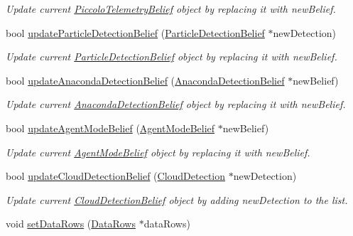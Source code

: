 \begin{DoxyCompactItemize}
\begin{DoxyCompactList}\small\item\em Update current \hyperlink{class_piccolo_telemetry_belief}{PiccoloTelemetryBelief} object by replacing it with newBelief. \end{DoxyCompactList}\item 
bool \hyperlink{class_belief_collection_aaa73023c8be3ca9863e5b72869dacd19}{updateParticleDetectionBelief} (\hyperlink{class_particle_detection_belief}{ParticleDetectionBelief} $\ast$newDetection)
\begin{DoxyCompactList}\small\item\em Update current \hyperlink{class_particle_detection_belief}{ParticleDetectionBelief} object by replacing it with newBelief. \end{DoxyCompactList}\item 
bool \hyperlink{class_belief_collection_a5a3643b52ba4df67515bcac030c78319}{updateAnacondaDetectionBelief} (\hyperlink{class_anaconda_detection_belief}{AnacondaDetectionBelief} $\ast$newBelief)
\begin{DoxyCompactList}\small\item\em Update current \hyperlink{class_anaconda_detection_belief}{AnacondaDetectionBelief} object by replacing it with newBelief. \end{DoxyCompactList}\item 
bool \hyperlink{class_belief_collection_a73c5a4b3869372dffbf57fc3f570f57c}{updateAgentModeBelief} (\hyperlink{class_agent_mode_belief}{AgentModeBelief} $\ast$newBelief)
\begin{DoxyCompactList}\small\item\em Update current \hyperlink{class_agent_mode_belief}{AgentModeBelief} object by replacing it with newBelief. \end{DoxyCompactList}\item 
bool \hyperlink{class_belief_collection_a6a063241841e74bc9e2caaff3a18b763}{updateCloudDetectionBelief} (\hyperlink{class_cloud_detection}{CloudDetection} $\ast$newDetection)
\begin{DoxyCompactList}\small\item\em Update current \hyperlink{class_cloud_detection_belief}{CloudDetectionBelief} object by adding newDetection to the list. \end{DoxyCompactList}\item 
void \hyperlink{class_belief_collection_a22d8a05b224e5a11430d81f332c9e4c4}{setDataRows} (\hyperlink{struct_data_rows}{DataRows} $\ast$dataRows)

\end{DoxyCompactItemize}

